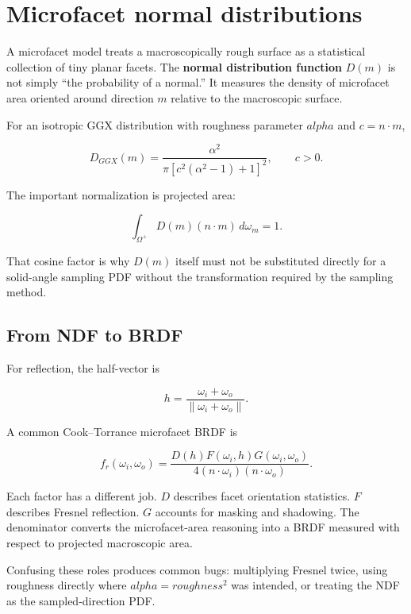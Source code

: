 \hypertarget{appendix-885c1cb64ae9}{}\label{referencestart:appendix-885c1cb64ae9}
\section{Microfacet normal distributions}\label{appendix-885c1cb64ae9-microfacet-normal-distributions}

A microfacet model treats a macroscopically rough surface as a statistical collection of tiny planar facets. The \textbf{normal distribution function} \(D(m)\) is not simply ``the probability of a normal.'' It measures the density of microfacet area oriented around direction \(m\) relative to the macroscopic surface.

For an isotropic GGX distribution with roughness parameter \(alpha\) and \(c = n\cdot m\),

\[
D_{GGX}(m)=
\frac{\alpha^2}
{\pi\left[c^2(\alpha^2-1)+1\right]^2},
\qquad c>0.
\]

The important normalization is projected area:

\[
\int_{\Omega^+} D(m)(n\cdot m)\,d\omega_m = 1.
\]

That cosine factor is why \(D(m)\) itself must not be substituted directly for a solid-angle sampling PDF without the transformation required by the sampling method.

\subsection{From NDF to BRDF}\label{appendix-885c1cb64ae9-from-ndf-to-brdf}

For reflection, the half-vector is

\[
h=\frac{\omega_i+\omega_o}{\|\omega_i+\omega_o\|}.
\]

A common Cook--Torrance microfacet BRDF is

\[
f_r(\omega_i,\omega_o)=
\frac{D(h)F(\omega_i,h)G(\omega_i,\omega_o)}
{4(n\cdot\omega_i)(n\cdot\omega_o)}.
\]

Each factor has a different job. \(D\) describes facet orientation statistics. \(F\) describes Fresnel reflection. \(G\) accounts for masking and shadowing. The denominator converts the microfacet-area reasoning into a BRDF measured with respect to projected macroscopic area.

Confusing these roles produces common bugs: multiplying Fresnel twice, using roughness directly where \(alpha=roughness^2\) was intended, or treating the NDF as the sampled-direction PDF.

